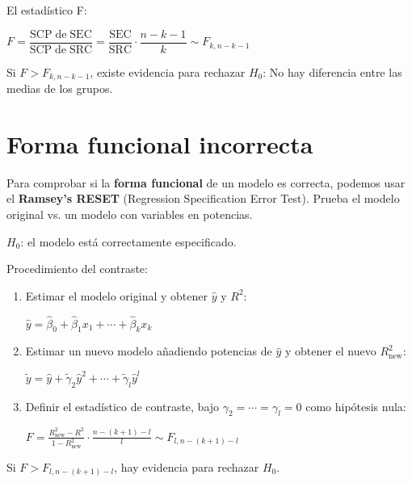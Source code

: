 \documentclass[10pt, a4paper, landscape]{extarticle}
\newcommand{\SSR}{\mathrm{SRC}}
\newcommand{\SSE}{\mathrm{SEC}}
\begin{document}
\begin{multicols}{3}
El estadístico F:

\begin{center}
	$F = \dfrac{\mathrm{SCP \; de \;} \SSE}{\mathrm{SCP \; de \;} \SSR} = \dfrac{\SSE}{\SSR} \cdot \dfrac{n - k - 1}{k} \sim F_{k, n - k - 1}$
\end{center}

Si $F > F_{k, n - k - 1}$, existe evidencia para rechazar $H_0$: No hay diferencia entre las medias de los grupos.

\columnbreak

\section*{Forma funcional incorrecta}

Para comprobar si la \textbf{forma funcional} de un modelo es correcta, podemos usar el \textbf{Ramsey's RESET} (Regression Specification Error Test). Prueba el modelo original vs. un modelo con variables en potencias.

\begin{center}
	$H_0$: el modelo está correctamente especificado.
\end{center}

Procedimiento del contraste:

\begin{enumerate}[leftmargin=*]
	\item Estimar el modelo original y obtener $\hat{y}$ y $R^2$:
	\begin{center}
		$\hat{y} = \hat{\beta}_0 + \hat{\beta}_1 x_1 + \cdots + \hat{\beta}_k x_k$
	\end{center}
	\item Estimar un nuevo modelo añadiendo potencias de $\hat{y}$ y obtener el nuevo $R^2_{\mathrm{new}}$:
	\begin{center}
		$\tilde{y} = \hat{y} + \tilde{\gamma}_2 \hat{y}^2 + \cdots + \tilde{\gamma}_l \hat{y}^l$
	\end{center}
	\item Definir el estadístico de contraste, bajo $\gamma_2 = \cdots = \gamma_l = 0$ como hipótesis nula:
	\begin{center}
		$F = \frac{R^2_{\mathrm{new}} - R^2}{1 - R^2_{\mathrm{new}}} \cdot \frac{n - (k + 1) - l}{l} \sim F_{l, n - (k + 1) - l}$
	\end{center}
\end{enumerate}

Si $F > F_{l, n - (k + 1) - l}$, hay evidencia para rechazar $H_0$.


\end{multicols}
\end{document}

